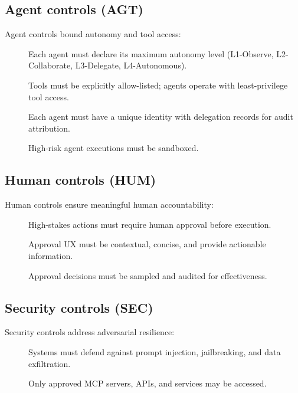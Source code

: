 \subsection{Agent controls (AGT)}

Agent controls bound autonomy and tool access:

\begin{description}
  \item[] Each agent must declare its maximum autonomy level
        (L1-Observe, L2-Collaborate, L3-Delegate, L4-Autonomous).
  \item[] Tools must be explicitly allow-listed; agents
        operate with least-privilege tool access.
  \item[] Each agent must have a unique identity with
        delegation records for audit attribution.
  \item[] High-risk agent executions must be sandboxed.
\end{description}

\subsection{Human controls (HUM)}

Human controls ensure meaningful human accountability:

\begin{description}
  \item[] High-stakes actions must require human approval
        before execution.
  \item[] Approval UX must be contextual, concise, and
        provide actionable information.
  \item[] Approval decisions must be sampled and audited
        for effectiveness.
\end{description}

\subsection{Security controls (SEC)}

Security controls address adversarial resilience:

\begin{description}
  \item[] Systems must defend against prompt injection,
        jailbreaking, and data exfiltration.
  \item[] Only approved MCP servers, APIs, and services
        may be accessed.
\end{description}


